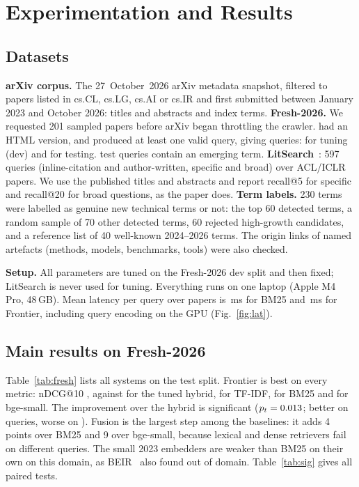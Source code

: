 \section{Experimentation and Results}
\subsection{Datasets}
\textbf{arXiv corpus.} The 27~October~2026 arXiv metadata snapshot, filtered to
papers listed in cs.CL, cs.LG, cs.AI or cs.IR and first submitted between January
2023 and October 2026: \NDocs{} titles and abstracts and \NTerms{} index terms.
\textbf{Fresh-2026.} We requested 201 sampled papers before arXiv began throttling
the crawler. \NCrawled{} had an HTML version, and \NPapers{} produced at least one
valid query, giving \NFresh{} queries: \NDev{} for tuning (dev) and \NTest{} for
testing. \NTermQ{} test queries contain an emerging term.
\textbf{LitSearch}~\cite{ajith2024}: 597 queries (inline-citation and author-written,
specific and broad) over \NLitDocs{} ACL/ICLR papers. We use the published titles and
abstracts and report recall@5 for specific and recall@20 for broad questions, as the
paper does.
\textbf{Term labels.} 230 terms were labelled as genuine new technical
terms or not: the top 60 detected terms, a random sample of 70 other detected terms,
60 rejected high-growth candidates, and a reference list of 40 well-known
2024--2026 terms. The origin links of \OriginNamed{} named artefacts (methods,
models, benchmarks, tools) were also checked.

\textbf{Setup.} All parameters are tuned on the Fresh-2026 dev split and then fixed;
LitSearch is never used for tuning. Everything runs on one laptop (Apple M4 Pro,
48\,GB). Mean latency per query over \NDocs{} papers is \LatBm{}\,ms for BM25 and
\LatFrontier{}\,ms for Frontier, including query encoding on the GPU
(Fig.~\ref{fig:lat}).

\subsection{Main results on Fresh-2026}
Table~\ref{tab:fresh} lists all systems on the test split. Frontier is best on every
metric: nDCG@10 \FrontierNdcg{}, against \HybridNdcg{} for the tuned hybrid,
\TfidfNdcg{} for TF-IDF, \BmNdcg{} for BM25 and \BgeNdcg{} for bge-small. The
improvement over the hybrid is significant ($p_t=0.013$; better on \SigWins{}
queries, worse on \SigLosses{}). Fusion is the largest step among the baselines: it
adds 4 points over BM25 and 9 over bge-small, because lexical and dense retrievers
fail on different queries. The small 2023 embedders are weaker than BM25 on their
own on this domain, as BEIR~\cite{thakur2021} also found out of domain.
Table~\ref{tab:sig} gives all paired tests.

